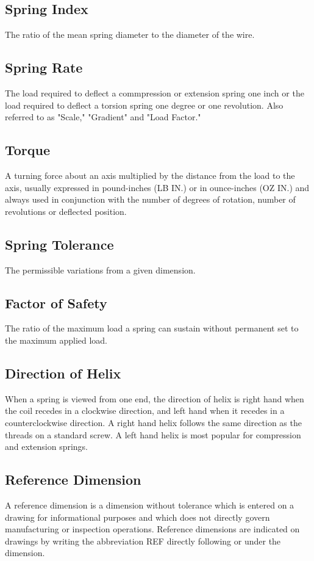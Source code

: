 \documentclass[10pt]{article}
\begin{document}
\subsection{Spring Index}
The ratio of the mean spring diameter to the diameter of the wire.
\subsection{Spring Rate}
The load required to deflect a commpression or extension spring one inch or the load required to deflect a torsion spring one degree or one revolution. 
Also referred to as "Scale," "Gradient" and "Load Factor."
\subsection{Torque}
A turning force about an axis multiplied by the distance from the
load to the axis, usually expressed in pound-inches (LB IN.) or in ounce-inches (OZ IN.) and always used in conjunction with the number of degrees of rotation, number of revolutions or deflected position.
\subsection{Spring Tolerance}
The permissible variations from a given dimension.
\subsection{Factor of Safety}
The ratio of the maximum load a spring can sustain without permanent set to the maximum applied load.
\subsection{Direction of Helix}
When a spring is viewed from one end, the direction of helix is right hand when the coil recedes in a clockwise direction, and left hand when it recedes in a counterclockwise direction. 
A right hand helix follows the same direction as the threads on a standard screw. 
A left hand helix is most popular for compression and extension springs.
\subsection{Reference Dimension}
A reference dimension is a dimension without tolerance which is entered on a drawing for informational purposes and which does not directly govern manufacturing or inspection operations. 
Reference dimensions are indicated on drawings by writing the abbreviation REF directly following or under the dimension.
\end{document}
